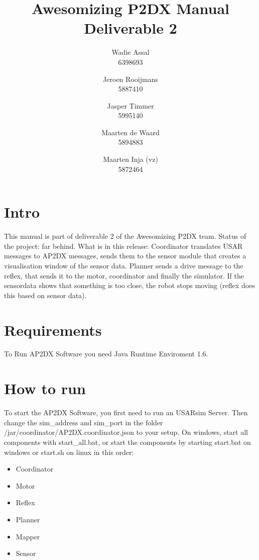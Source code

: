 \documentclass[a4paper, notitlepage]{article}
\title{Awesomizing P2DX Manual Deliverable 2}
\author{Wadie Assal \\ 6398693 \and Jeroen Rooijmans \\ 5887410 \and Jasper Timmer \\ 5995140 \and Maarten de Waard \\ 5894883 \and Maarten Inja (vz) \\ 5872464}
\begin{document}
\maketitle

\section{Intro}
This manual is part of deliverable 2 of the Awesomizing P2DX team. Status of the project: far behind. What is in this release: Coordinator translates USAR messages to AP2DX messages, sends them to the sensor module that creates a visualisation window of the sensor data. Planner sends a drive message to the reflex, that sends it to the motor, coordinator and finally the simulator. If the sensordata shows that something is too close, the robot stops moving (reflex does this based on sensor data).

\section{Requirements}
To Run AP2DX Software you need Java Runtime Enviroment 1.6. 

\section{How to run}
To start the AP2DX Software, you first need to run an USARsim Server. Then change the sim\_address and sim\_port in the folder /jar/coordinator/AP2DX.coordinator.json to your setup. On windows, start all components with start\_all.bat, or start the components by starting start.bat on windows or start.sh on linux in this order:
\begin{itemize}
\item Coordinator
\item Motor
\item Reflex
\item Planner
\item Mapper
\item Sensor
\end{itemize}
\end{document}
